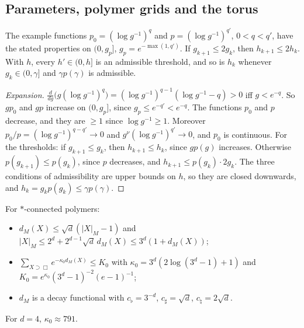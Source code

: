 \subsection{Parameters, polymer grids and the torus}\label{xb:geometry}

\begin{detail}\label{xb:d-params}
The example functions $p_0=(\log g^{-1})^q$ and $p=(\log g^{-1})^{q'}$, $0<q<q'$, have the stated properties on $(0,g_p]$, $g_p=e^{-\max(1,q')}$. If $g_{k+1}\le2g_k$, then $h_{k+1}\le2h_k$. With $h$, every $h'\in(0,h]$ is an admissible threshold, and so is $h_k$ whenever $g_k\in(0,\gamma]$ and $\gamma p(\gamma)$ is admissible.
\end{detail}

\begin{proof}[Expansion]
$\frac d{dg}\big(g(\log g^{-1})^q\big)=(\log g^{-1})^{q-1}(\log g^{-1}-q)>0$ iff $g<e^{-q}$. So $gp_0$ and $gp$ increase on $(0,g_p]$, since $g_p\le e^{-q'}<e^{-q}$. The functions $p_0$ and $p$ decrease, and they are $\ge1$ since $\log g^{-1}\ge1$. Moreover $p_0/p=(\log g^{-1})^{q-q'}\to0$ and $g^\nu(\log g^{-1})^{q'}\to0$, and $p_0$ is continuous. For the thresholds: if $g_{k+1}\le g_k$, then $h_{k+1}\le h_k$, since $gp(g)$ increases. Otherwise $p(g_{k+1})\le p(g_k)$, since $p$ decreases, and $h_{k+1}\le p(g_k)\cdot2g_k$. The three conditions of admissibility are upper bounds on $h$, so they are closed downwards, and $h_k=g_kp(g_k)\le\gamma p(\gamma)$.
\end{proof}

\begin{detail}\label{xb:d-dM}
For $*$-connected polymers:
\begin{itemize}
\item $d_M(X)\le\sqrt d(|X|_M-1)$ and $|X|_M\le2^d+2^{d-1}\sqrt d\,d_M(X)\le3^d(1+d_M(X))$;
\item $\sum_{X\supset\Box}e^{-\kappa_0d_M(X)}\le K_0$ with $\kappa_0=3^d(2\log(3^d-1)+1)$ and $K_0=e^{\kappa_0}(3^d-1)^{-2}(e-1)^{-1}$;
\item $d_M$ is a decay functional with $c_\flat=3^{-d}$, $c_\sharp=\sqrt d$, $c_\natural=2\sqrt d$.
\end{itemize}
For $d=4$, $\kappa_0\approx791$.
\end{detail}

